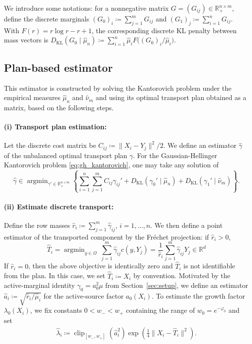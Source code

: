 \documentclass[11pt,reqno]{amsart}
\theoremstyle{definition}
\newcommand{\R}{\mathbb{R}}
\newcommand{\KL}{\mathrm{KL}}
\renewcommand{\hat}{\widehat}
\DeclareMathOperator*{\argmin}{arg min}
\DeclareMathOperator{\clip}{clip}
\begin{document}
We introduce some notations: for a nonnegative matrix $G=(G_{ij})\in\R_+^{n\times m}$, define the discrete marginals $(G_0)_i \coloneqq \sum_{j=1}^m G_{ij}$ and $(G_1)_j \coloneqq \sum_{i=1}^n G_{ij}$.
With $F(r)=r\log r-r+1$, the corresponding discrete KL penalty between mass vectors is
$
    D_\KL(G_0\mid\hat\mu_n)
    \coloneqq
    \sum_{i=1}^n \hat\mu_i  F\bigl((G_0)_i / \hat\mu_i\bigr).
$

\subsection{Plan-based estimator} \label{sec:plan}



This estimator is constructed by solving the Kantorovich problem under the empirical measures $\hat{\mu}_n$ and $\hat{\nu}_m$ and using its optimal transport plan obtained as a matrix, based on the following steps.

\paragraph{(i) Transport plan estimation:}
Let the discrete cost matrix be $C_{ij} \coloneqq \|X_i - Y_j \|^2/2$. We define an estimator $\hat\gamma$ of the unbalanced optimal transport plan $\gamma$. For the Gaussian-Hellinger Kantorovich problem \eqref{eq:gh_kantorovich}, one may take any solution of
\begin{equation}
\hat\gamma\in\argmin_{\gamma'\in\R_+^{n\times m}}
\left\{
\sum_{i=1}^n\sum_{j=1}^m C_{ij}\gamma_{ij}'
+D_\KL(\gamma_0'\mid\hat\mu_n)+D_\KL(\gamma_1'\mid\hat\nu_m)
\right\}.
\end{equation}

\paragraph{(ii) Estimate discrete transport:}
Define the row masses $\hat r_i \coloneqq \sum_{j=1}^m \hat\gamma_{ij}$, $i=1,\dots,n$. We then define a point estimator of the transported component by the Fr\'echet projection: if $\hat r_i > 0$, 
\begin{equation}\label{eq:disc-frechet}
\hat T_i = \argmin_{y\in\Omega}\ \sum_{j=1}^m \hat\gamma_{ij} c(y,Y_j) = \frac{1}{\hat r_i}\sum_{j=1}^m \hat\gamma_{ij} Y_j \in \R^d
\end{equation}
If $\hat r_i = 0$, then the above objective is identically zero and $\hat T_i$ is not identifiable from the plan. In this case, we set $\hat T_i \coloneqq X_i$ by convention. 
Motivated by the active-marginal identity $\gamma_0=a_0^2\mu$ from Section~\ref{sec:setup}, we define an estimator $\hat a_i \coloneqq \sqrt{{\hat r_i}/{\hat\mu_i}}$ for the active-source factor $a_0(X_i)$.
To estimate the growth factor $\lambda_0(X_i)$, we fix constants $0<w_-<w_+$ containing the range of $w_0=e^{-\varphi_0}$ and set
\begin{align}
\label{eq:disc-gh-growth}
    \hat\lambda_i
    \coloneqq
    \clip_{[w_-,w_+]}(\hat a_i^2)
    \exp\left(\frac14\|X_i-\hat T_i\|^2\right).
\end{align}
\end{document}
